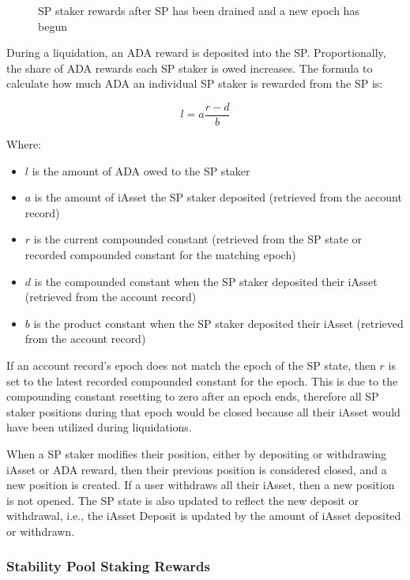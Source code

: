 \documentclass{article}
\begin{document}
\begin{sloppypar}
\hypertarget{stability-user-epoch-rewards}{%
\begin{figure}[htbp]
\centering

\caption{SP staker rewards after SP has been
drained and a new epoch has begun}
\label{stability-user-epoch-rewards}
\end{figure}}

During a liquidation, an ADA reward is deposited into the SP.
Proportionally, the share of ADA rewards each SP staker is owed
increases. The formula to calculate how much ADA an individual SP staker
is rewarded from the SP is:

\[l = a\frac{r - d}{b}\]

Where:

\begin{itemize}
\item
  \(l\) is the amount of ADA owed to the SP staker
\item
  \(a\) is the amount of iAsset the SP staker deposited (retrieved from
  the account record)
\item
  \(r\) is the current compounded constant (retrieved from the SP state
  or recorded compounded constant for the matching epoch)
\item
  \(d\) is the compounded constant when the SP staker deposited their
  iAsset (retrieved from the account record)
\item
  \(b\) is the product constant when the SP staker deposited their
  iAsset (retrieved from the account record)
\end{itemize}

If an account record's epoch does not match the epoch of the SP state,
then \(r\) is set to the latest recorded compounded constant for the
epoch. This is due to the compounding constant resetting to zero after
an epoch ends, therefore all SP staker positions during that epoch would
be closed because all their iAsset would have been utilized during
liquidations.

When a SP staker modifies their position, either by depositing or
withdrawing iAsset or ADA reward, then their previous position is
considered closed, and a new position is created. If a user withdraws
all their iAsset, then a new position is not opened. The SP state is
also updated to reflect the new deposit or withdrawal, i.e., the iAsset
Deposit is updated by the amount of iAsset deposited or withdrawn.

\hypertarget{stability-pool-staking-rewards}{%
\subsubsection{Stability Pool Staking
Rewards}\label{stability-pool-staking-rewards}}


\end{sloppypar}
\end{document}
